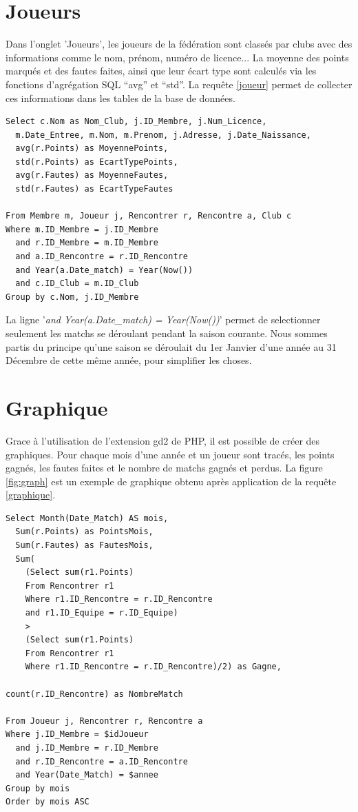 \documentclass[a4paper»,8pt,french,fleqn]{report}
\begin{document}
\section{Joueurs}
Dans l'onglet 'Joueurs', les joueurs de la fédération sont classés par clubs avec des informations comme le nom, prénom, numéro de licence... La moyenne des points marqués et des fautes faites, ainsi que leur écart type sont calculés via les fonctions d'agrégation SQL ``avg'' et ``std''. La requête \ref{joueur} permet de collecter ces informations dans les tables de la base de données.

\begin{lstlisting}
Select c.Nom as Nom_Club, j.ID_Membre, j.Num_Licence, 
  m.Date_Entree, m.Nom, m.Prenom, j.Adresse, j.Date_Naissance,
  avg(r.Points) as MoyennePoints,
  std(r.Points) as EcartTypePoints,
  avg(r.Fautes) as MoyenneFautes,
  std(r.Fautes) as EcartTypeFautes

From Membre m, Joueur j, Rencontrer r, Rencontre a, Club c
Where m.ID_Membre = j.ID_Membre
  and r.ID_Membre = m.ID_Membre
  and a.ID_Rencontre = r.ID_Rencontre
  and Year(a.Date_match) = Year(Now())
  and c.ID_Club = m.ID_Club
Group by c.Nom, j.ID_Membre
\end{lstlisting}

La ligne '\textit{and Year(a.Date\_match) = Year(Now())}' permet de selectionner seulement les matchs se déroulant pendant la saison courante. Nous sommes partis du principe qu'une saison se déroulait du 1er Janvier d'une année au 31 Décembre de cette même année, pour simplifier les choses.


\section{Graphique}
Grace à l'utilisation de l'extension gd2 de PHP, il est possible de créer des graphiques. Pour chaque mois d'une année et un joueur sont tracés, les points gagnés, les fautes faites et le nombre de matchs gagnés et perdus. La figure \ref{fig:graph} est un exemple de graphique obtenu après application de la requête \ref{graphique}.

\begin{lstlisting}
Select Month(Date_Match) AS mois,
  Sum(r.Points) as PointsMois,
  Sum(r.Fautes) as FautesMois,
  Sum(
    (Select sum(r1.Points)
    From Rencontrer r1
    Where r1.ID_Rencontre = r.ID_Rencontre
    and r1.ID_Equipe = r.ID_Equipe)
    >
    (Select sum(r1.Points)
    From Rencontrer r1
    Where r1.ID_Rencontre = r.ID_Rencontre)/2) as Gagne,
    
count(r.ID_Rencontre) as NombreMatch

From Joueur j, Rencontrer r, Rencontre a
Where j.ID_Membre = $idJoueur
  and j.ID_Membre = r.ID_Membre
  and r.ID_Rencontre = a.ID_Rencontre
  and Year(Date_Match) = $annee
Group by mois 
Order by mois ASC
\end{lstlisting}
\end{document}
